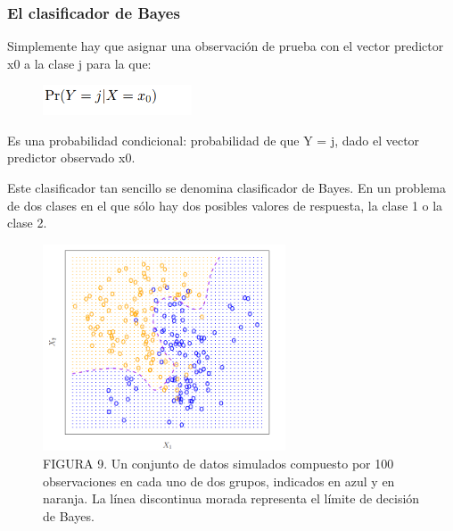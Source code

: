 \documentclass[
  letterpaper,
  DIV=11,
  numbers=noendperiod]{scrartcl}
\begin{document}
\hypertarget{el-clasificador-de-bayes}{%
\subsubsection{\texorpdfstring{\textbf{El clasificador de
Bayes}}{El clasificador de Bayes}}\label{el-clasificador-de-bayes}}

Simplemente hay que asignar una observación de prueba con el vector
predictor x0 a la clase j para la que:

\begin{figure}

{\centering \includegraphics[width=1.73958in,height=\textheight]{images/figura8.png}

}

\end{figure}

Es una probabilidad condicional: probabilidad de que Y = j, dado el
vector predictor observado x0.

Este clasificador tan sencillo se denomina clasificador de Bayes. En un
problema de dos clases en el que sólo hay dos posibles valores de
respuesta, la clase 1 o la clase 2.

\begin{figure}

{\centering \includegraphics[width=2.83333in,height=\textheight]{images/figura9.png}

}

\caption{FIGURA 9. Un conjunto de datos simulados compuesto por 100
observaciones en cada uno de dos grupos, indicados en azul y en naranja.
La línea discontinua morada representa el límite de decisión de Bayes.}

\end{figure}
\end{document}
